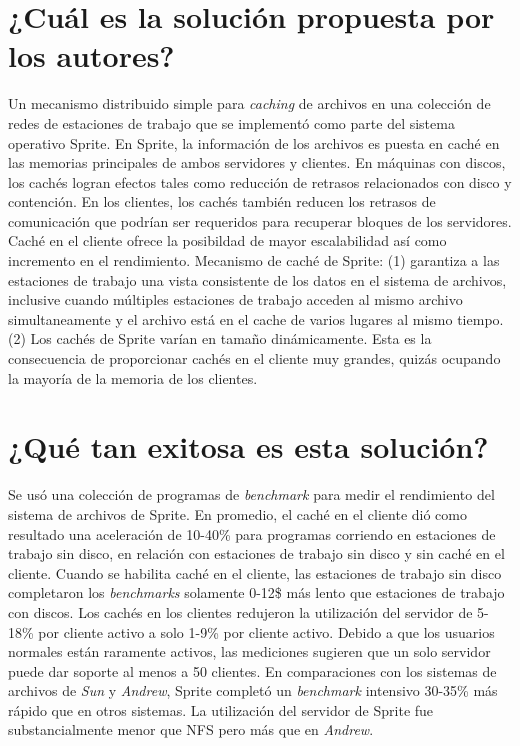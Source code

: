 \section{¿Cuál es la solución propuesta por los autores?}
Un mecanismo distribuido simple para \emph{caching} de archivos en una colección de redes de estaciones de trabajo que se implementó como parte del sistema operativo Sprite. En Sprite, la información de los archivos es puesta en caché en las memorias principales de ambos servidores y clientes. En máquinas con discos, los cachés logran efectos tales como reducción de retrasos relacionados con disco y contención. En los clientes, los cachés también reducen los retrasos de comunicación que podrían ser requeridos para recuperar bloques de los servidores. Caché en el cliente ofrece la posibildad de mayor escalabilidad así como incremento en el rendimiento. Mecanismo de caché de Sprite: (1) garantiza a las estaciones de trabajo una vista consistente de los datos en el sistema de archivos, inclusive cuando múltiples estaciones de trabajo acceden al mismo archivo simultaneamente y el archivo está en el cache de varios lugares al mismo tiempo. (2) Los cachés de Sprite varían en tamaño dinámicamente. Esta es la consecuencia de proporcionar cachés en el cliente muy grandes, quizás ocupando la mayoría de la memoria de los clientes.

\section{¿Qué tan exitosa es esta solución?} 
Se usó una colección de programas de \emph{benchmark} para medir el rendimiento del sistema de archivos de Sprite. En promedio, el caché en el cliente dió como resultado una aceleración de 10-40\% para programas corriendo en estaciones de trabajo sin disco, en relación con estaciones de trabajo sin disco y sin caché en el cliente. Cuando se habilita caché en el cliente, las estaciones de trabajo sin disco completaron los \emph{benchmarks} solamente 0-12\$ más lento que estaciones de trabajo con discos. Los cachés en los clientes redujeron la utilización del servidor de 5-18\% por cliente activo a solo 1-9\% por cliente activo. Debido a que los usuarios normales están raramente activos, las mediciones sugieren que un solo servidor puede dar soporte al menos a 50 clientes. En comparaciones con los sistemas de archivos de \emph{Sun} y \emph{Andrew}, Sprite completó un \emph{benchmark} intensivo 30-35\% más rápido que en otros sistemas. La utilización del servidor de Sprite fue substancialmente menor que NFS pero más que en \emph{Andrew}.
